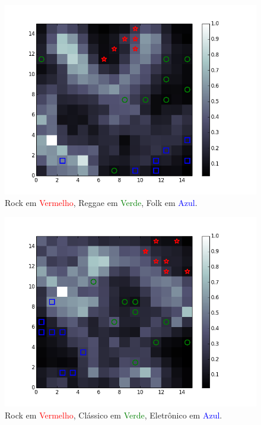 \documentclass[journal]{IEEEtran}
\begin{document}
\begin{figure}[H]
\centering
\includegraphics[scale=0.5]{images/mfccs_rock_reggae_folk.png}
\caption{Rock em \textcolor{red}{Vermelho}, Reggae em \textcolor{green}{Verde}, Folk em \textcolor{blue}{Azul}.}\label{mfccs_rock_reggae_folk}
\end{figure}

\begin{figure}[H]
\centering
\includegraphics[scale=0.5]{images/mfccs_rock_classical_eletronic.png}
\caption{Rock em \textcolor{red}{Vermelho}, Clássico em \textcolor{green}{Verde}, Eletrônico em \textcolor{blue}{Azul}.}\label{mfccs_rock_classical_eletronic}
\end{figure}
\end{document}
